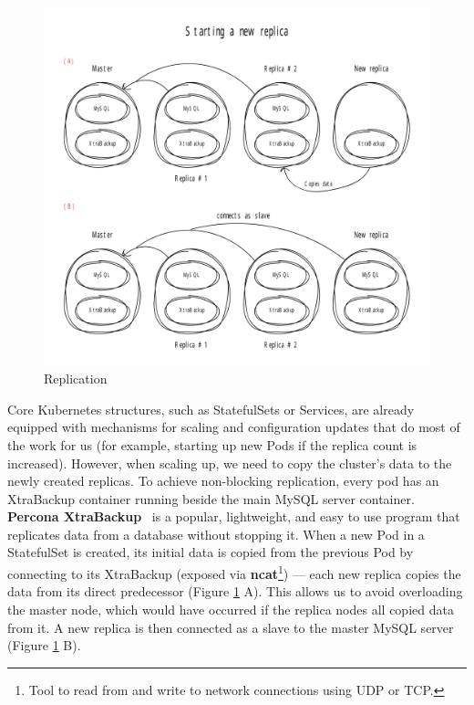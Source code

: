 \begin{figure}[!ht]
    \centering
    \includegraphics[width=1\textwidth, angle=0]{img/replication.pdf}
    \caption{Replication}
    \label{fig:replication}
\end{figure}

Core Kubernetes structures, such as StatefulSets or Services, are already equipped with mechanisms
for scaling and configuration updates that do most of the work for us (for example, starting up new
Pods if the replica count is increased). However, when scaling up, we need to copy the cluster’s
data to the newly created replicas. To achieve non-blocking replication, every pod has an XtraBackup
container running beside the main MySQL server container. \textbf{Percona XtraBackup}~\cite{percona}
is a popular, lightweight, and easy to use program that replicates data from a database without
stopping it. When a new Pod in a StatefulSet is created, its initial data is copied from the
previous Pod by connecting to its XtraBackup (exposed via \textbf{ncat}\footnote{Tool to read from and
write to network connections using UDP or TCP.}) --- each new replica copies the data from its direct
predecessor (Figure \ref{fig:replication} A). This allows us to avoid overloading the master node,
which would have occurred if the replica nodes all copied data from it. A new replica is then connected
as a slave to the master MySQL server (Figure \ref{fig:replication} B).

